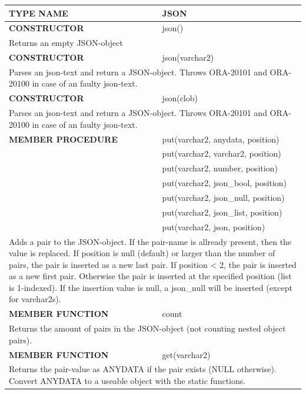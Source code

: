 \documentclass[11pt,twocolumn, a4paper]{article}
\begin{document}
\begin{longtable}{| l | l |}
\hline
  \rowcolor{gray}\color{white}\textbf{TYPE NAME} & \color{white}\textbf{JSON} \\
\hline

\hline
  \textbf{CONSTRUCTOR} & json()\\
\hline
  \multicolumn{2}{|p{15cm}|}{Returns an empty JSON-object} \\
\hline

\hline
  \textbf{CONSTRUCTOR} & json(varchar2)\\
\hline
  \multicolumn{2}{|p{15cm}|}{Parses an json-text and return a JSON-object. 
Throws ORA-20101 and ORA-20100 in case of an faulty json-text.} \\
\hline

\hline
  \textbf{CONSTRUCTOR} & json(clob)\\
\hline
  \multicolumn{2}{|p{15cm}|}{Parses an json-text and return a JSON-object. 
Throws ORA-20101 and ORA-20100 in case of an faulty json-text.} \\
\hline


\hline
  \textbf{MEMBER PROCEDURE} & put(varchar2, anydata, position)\\
  & put(varchar2, varchar2, position)\\
  & put(varchar2, number, position)\\
  & put(varchar2, json\_bool, position)\\
  & put(varchar2, json\_null, position)\\
  & put(varchar2, json\_list, position)\\
  & put(varchar2, json, position)\\
\hline
  \multicolumn{2}{|p{15cm}|}{Adds a pair to the JSON-object. If the pair-name is allready present, then the value is replaced. If position is null (default) or larger than the number of pairs, the pair is inserted as a new last pair. If position < 2, the pair is inserted as a new first pair. Otherwise the pair is inserted at the specified position (list is 1-indexed). If the insertion value is null, a json\_null will be inserted (except for varchar2s).} \\
\hline

\hline
  \textbf{MEMBER FUNCTION} & count\\
\hline
  \multicolumn{2}{|p{15cm}|}{Returns the amount of pairs in the JSON-object (not counting nested object pairs).} \\
\hline

\hline
  \textbf{MEMBER FUNCTION} & get(varchar2)\\
\hline
  \multicolumn{2}{|p{15cm}|}{Returns the pair-value as ANYDATA if the pair exists (NULL otherwise). Convert ANYDATA to a useable object with the static functions.} \\
\hline


\end{longtable}
\end{document}
